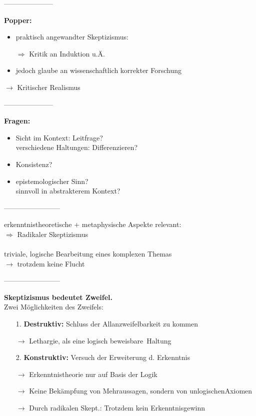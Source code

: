\documentclass[12pt,a4paper]{article}
\begin{document}
---------------------

\textbf{Popper:}
\begin{itemize}
\item praktisch angewandter Skeptizismus:
\item[$\Rightarrow$] Kritik an Induktion u.Ä.
\item jedoch glaube an wissenschaftlich korrekter Forschung
\end{itemize}
$\rightarrow$ \glqq Kritischer Realismus\grqq


---------------------

\textbf{Fragen:}
\begin{itemize}
\item Sicht im Kontext: Leitfrage?\\
verschiedene Haltungen: Differenzieren?
\item Konsistenz?
\item epistemologischer Sinn?\\
sinnvoll in abstrakterem Kontext?
\end{itemize}


------------------------

erkenntnistheoretische + metaphysische Aspekte relevant:\\
$\Rightarrow$ Radikaler Skeptizismus\\
\ \\
\glqq triviale\grqq , logische Bearbeitung eines komplexen Themas\\
$\rightarrow$ trotzdem keine \glqq Flucht\grqq

------------------------

\textbf{Skeptizismus bedeutet Zweifel.}\\
Zwei Möglichkeiten des Zweifels:
\begin{itemize}
\item[1.] \textbf{Destruktiv:} Schluss der Allanzweifelbarkeit zu kommen\\
\item[$\rightarrow$] \glqq Lethargie\grqq , als eine logisch \glqq beweisbare\grqq\ Haltung
\item[2.] \textbf{Konstruktiv:} Versuch der Erweiterung d. Erkenntnis
\item[$\rightarrow$] Erkenntnistheorie nur auf Basis der Logik
\item[$\rightarrow$] Keine Bekämpfung von Mehraussagen, sondern von \glqq unlogischen\grqq Axiomen
\item[$\rightarrow$] Durch radikalen Skept.: Trotzdem kein Erkenntnisgewinn
\end{itemize}
\end{document}
